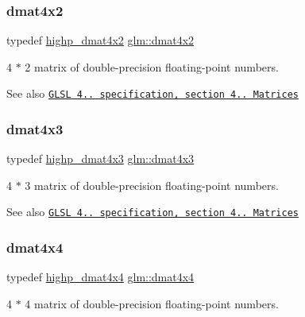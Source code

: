 \subsubsection{\texorpdfstring{dmat4x2}{dmat4x2}}
{\footnotesize\ttfamily typedef \hyperlink{group__core__precision_gaa0a2369be2e3d5a4db98cae345413dc1}{highp\+\_\+dmat4x2} \hyperlink{group__core__types_gab3d51ce41e6f0aa267d3e185cee09c44}{glm\+::dmat4x2}}

4 $\ast$ 2 matrix of double-\/precision floating-\/point numbers.

\begin{DoxySeeAlso}{See also}
\href{http://www.opengl.org/registry/doc/GLSLangSpec.4.20.8.pdf}{\tt G\+L\+SL 4.. specification, section 4.. Matrices} 
\end{DoxySeeAlso}
\mbox{\label{group__core__types_gaa4a157ac183c5bd5dcbd555a94b1b505}} 
\subsubsection{\texorpdfstring{dmat4x3}{dmat4x3}}
{\footnotesize\ttfamily typedef \hyperlink{group__core__precision_gaec00d802f271a807485a0069cdb5ea05}{highp\+\_\+dmat4x3} \hyperlink{group__core__types_gaa4a157ac183c5bd5dcbd555a94b1b505}{glm\+::dmat4x3}}

4 $\ast$ 3 matrix of double-\/precision floating-\/point numbers.

\begin{DoxySeeAlso}{See also}
\href{http://www.opengl.org/registry/doc/GLSLangSpec.4.20.8.pdf}{\tt G\+L\+SL 4.. specification, section 4.. Matrices} 
\end{DoxySeeAlso}
\mbox{\label{group__core__types_ga54d90d4b902d93638b906571af215bb1}} 
\subsubsection{\texorpdfstring{dmat4x4}{dmat4x4}}
{\footnotesize\ttfamily typedef \hyperlink{group__core__precision_ga46855bd8fdcb8dbc7db5d2aaeb91be69}{highp\+\_\+dmat4x4} \hyperlink{group__core__types_ga54d90d4b902d93638b906571af215bb1}{glm\+::dmat4x4}}

4 $\ast$ 4 matrix of double-\/precision floating-\/point numbers.

